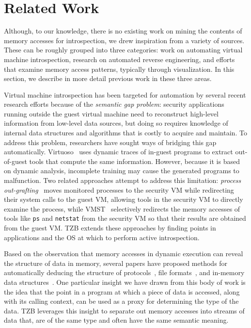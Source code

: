 \section{Related Work}
\label{sec:relwork}

Although, to our knowledge, there is no existing work on mining the
contents of memory accesses for introspection, we drew inspiration from
a variety of sources. These can be roughly grouped into three
categories: work on automating virtual machine introspection, research
on automated reverse engineering, and efforts that examine memory access
patterns, typically through visualization. In this section, we describe
in more detail previous work in these three areas.

Virtual machine introspection has been targeted for automation by
several recent research efforts because of the \emph{semantic gap
problem}: security applications running outside the guest virtual
machine need to reconstruct high-level information from low-level data
sources, but doing so requires knowledge of internal data structures and
algorithms that is costly to acquire and maintain. To address this
problem, researchers have sought ways of bridging this gap
automatically. Virtuoso~\cite{Dolan-Gavitt:2011uq} uses dynamic traces
of in-guest programs to extract out-of-guest tools that compute the same
information. However, because it is based on dynamic analysis,
incomplete training may cause the generated programs to malfunction. Two
related approaches attempt to address this limitation: \emph{process
out-grafting}~\cite{Srinivasan:2011fk} moves monitored processes to the
security VM while redirecting their system calls to the guest VM,
allowing tools in the security VM to directly examine the process, while
VMST~\cite{Fu:2012fk} selectively redirects the memory accesses of tools
like \texttt{ps} and \texttt{netstat} from the security VM so that their
results are obtained from the guest VM. TZB extends these approaches by
finding points in applications and the OS at which to perform active
introspection.

Based on the observation that memory accesses in dynamic execution can
reveal the structure of data in memory, several papers have proposed
methods for automatically deducing the structure of
protocols~\cite{Caballero:2007fk,Lin:2008uq,Cui:2007kx}, file
formats~\cite{Cui:2008ys,Lin:2008vn}, and in-memory data
structures~\cite{Lee:2011,Slowinska:2011ys,Lin:2010}. One particular
insight we have drawn from this body of work is the idea that the point
in a program at which a piece of data is accessed, along with its
calling context, can be used as a proxy for determining the type of the
data. TZB leverages this insight to separate out memory accesses into
streams of data that, are of the same type and often have the same
semantic meaning.

